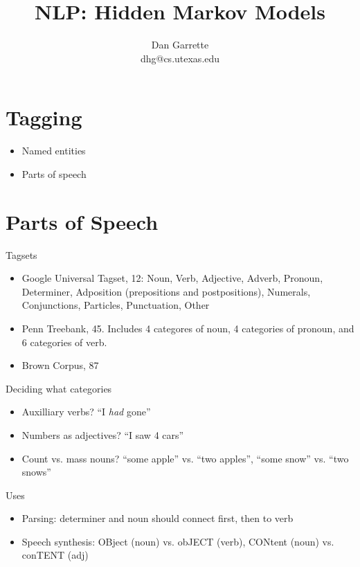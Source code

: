 \documentclass[11pt,letterpaper]{article}
\title{NLP: Hidden Markov Models}
\author{Dan Garrette\\\small{dhg@cs.utexas.edu}}
\begin{document}
\maketitle



\section{Tagging}

\begin{itemize}
  \item Named entities
  \item Parts of speech
\end{itemize}




\section{Parts of Speech}

Tagsets

\begin{itemize}
  \item Google Universal Tagset, 12: Noun, Verb, Adjective, Adverb, Pronoun, Determiner, Adposition (prepositions and postpositions), Numerals, Conjunctions, Particles, Punctuation, Other
  \item Penn Treebank, 45.  Includes 4 categores of noun, 4 categories of pronoun, and 6 categories of verb.
  \item Brown Corpus, 87
\end{itemize}

Deciding what categories

\begin{itemize}
  \item Auxilliary verbs?  ``I \textit{had} gone''
  \item Numbers as adjectives? ``I saw 4 cars''
  \item Count vs. mass nouns?  ``some apple'' vs. ``two apples'', ``some snow'' vs. ``two snows''
\end{itemize}

Uses

\begin{itemize}
  \item Parsing: determiner and noun should connect first, then to verb
  \item Speech synthesis: OBject (noun) vs. obJECT (verb), CONtent (noun) vs. conTENT (adj)
\end{itemize}
\end{document}
